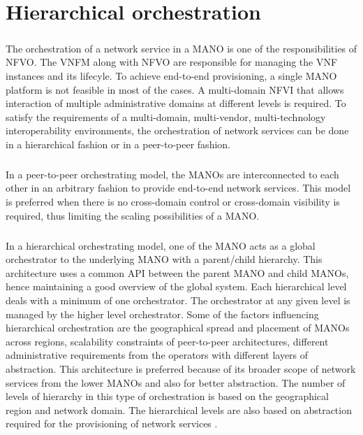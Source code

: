\chapter{Hierarchical orchestration}
\label{ch:Hierarchical Orchestration}

\paragraph{} The orchestration of a network service in a MANO is one of the responsibilities of NFVO. The VNFM along with NFVO are responsible for managing the VNF instances and its lifecyle. To achieve end-to-end provisioning, a single MANO platform is not feasible in most of the cases. 
A multi-domain NFVI that allows interaction of multiple administrative domains at different levels is required.
To satisfy the requirements of a multi-domain, multi-vendor, multi-technology interoperability environments, the orchestration of network services can be done in a hierarchical fashion or in a peer-to-peer fashion. \cite{munoz2018hierarchical}

\paragraph{} In a peer-to-peer orchestrating model, the MANOs are interconnected to each other in an arbitrary fashion to provide end-to-end network services. This model is preferred when
there is no cross-domain control or cross-domain visibility is required, thus limiting the scaling
possibilities of a MANO. \cite{munoz2018hierarchical}


\paragraph{}In a hierarchical orchestrating model, one of the MANO acts as a global orchestrator to the
underlying MANO with a parent/child hierarchy. This architecture uses a common API between
the parent MANO and child MANOs, hence maintaining a good overview of the global system. Each hierarchical level deals with a minimum of one orchestrator. The orchestrator at any given level is managed by the higher level orchestrator. Some of the factors influencing hierarchical orchestration are the geographical spread and placement of MANOs across regions, scalability constraints of peer-to-peer architectures, different administrative requirements from the operators with different layers of abstraction. This architecture is preferred because of its broader scope of network services from the lower MANOs and also for better abstraction. The number of levels of hierarchy in this type of orchestration is based on the geographical region and network domain. The hierarchical levels are also based on abstraction required for the provisioning of network services \cite{munoz2018hierarchical}.


